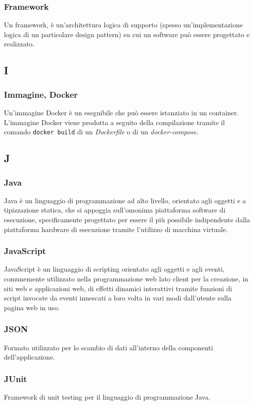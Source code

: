 \subsubsection*{Framework}  Un framework, è un'architettura logica di supporto (spesso un'implementazione logica di un particolare design pattern) su cui un software può essere progettato e realizzato.
\subsection{I}
\subsubsection*{Immagine, Docker} Un'immagine Docker è un eseguibile che può essere istanziato in un container. L'immagine Docker viene prodotta a seguito della compilazione tramite il comando \verb!docker build! di un \textit{Dockerfile} o di un \textit{docker-compose}.
\subsection{J}
\subsubsection*{Java}  Java è un linguaggio di programmazione ad alto livello, orientato agli oggetti e a tipizzazione statica, che si appoggia sull'omonima piattaforma software di esecuzione, specificamente progettato per essere il più possibile indipendente dalla piattaforma hardware di esecuzione tramite l'utilizzo di macchina virtuale.
\subsubsection*{JavaScript}  JavaScript è un linguaggio di scripting orientato agli oggetti e agli eventi, comunemente utilizzato nella programmazione web lato client per la creazione, in siti web e applicazioni web, di effetti dinamici interattivi tramite funzioni di script invocate da eventi innescati a loro volta in vari modi dall'utente sulla pagina web in uso.
\subsubsection*{JSON}
Formato utilizzato per lo scambio di dati all'interno della componenti dell'applicazione.
\subsubsection*{JUnit}
Framework di unit testing per il linguaggio di programmazione Java.
